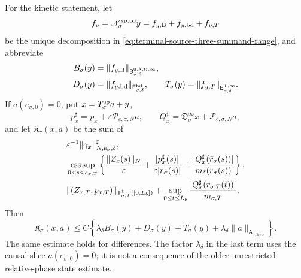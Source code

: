 \begin{lemma}
For the kinetic statement, let
\begin{equation}
 f_y=\mathscr N_\sigma^{\rm sp,\infty}y
 =f_{y,\rm B}+f_{y,\rm bd}+f_{y,T}               \label{eq:kinetic-normal-data-split}
\end{equation}
be the unique decomposition in
\cref{eq:terminal-source-three-summand-range}, and abbreviate
\begin{align}
 B_\sigma(y)&=\|f_{y,\rm B}\|_
  {\mathsf B_{\sigma,\delta}^{0,\lambda,
        \mathrm{tf},\infty}},\notag\\
 D_\sigma(y)&=\|f_{y,\rm bd}\|_
       {\mathsf E_{\sigma,\delta}^{\rm bd}},\qquad
 T_\sigma(y)=\|f_{y,T}\|_
       {\mathsf E_{\sigma,\delta}^{T,\infty}}.  \label{eq:kinetic-normal-data-sizes}
\end{align}
If \(a(e_{\sigma,0})=0\), put
\(x=T_\sigma^{\rm sp}a+y\),
\begin{equation}
 p_x^\sharp=p_x+\varepsilon\mathscr P_{c,\sigma,N}a,
 \qquad
 Q_x^\sharp=\mathfrak D_\sigma^\infty x
                  +\mathscr P_{c,\sigma,N}a,     \label{eq:kinetic-shifted-state}
\end{equation}
and let \(\mathfrak K_\sigma(x,a)\) be the sum of
\begin{align}
 &\varepsilon^{-1}\|\gamma_x\|_{N,e_\sigma,\delta}^{\sharp},\notag\\
 &\operatorname*{ess\,sup}_{0<s<s_{\sigma,T}}
 \left\{\frac{\|Z_x(s)\|_N}{\varepsilon}
 +\frac{|p_x^\sharp(s)|}{\varepsilon|\bar r_\sigma(s)|}
 +\frac{|Q_x^\sharp(\bar r_\sigma(s))|}
             {m_\delta(\bar r_\sigma(s))}\right\},\notag\\
 &\|(Z_{x,T},p_{x,T})\|_
          {\mathsf T_{\sigma,T}^1([0,L_b])}
 +\sup_{0\le t\le L_b}
      \frac{|Q_x^\sharp(\bar r_{\sigma,T}(t))|}{m_{\sigma,T}}.
                                                        \label{eq:piecewise-kinetic-observable}
\end{align}
Then
\begin{equation}
 \mathfrak K_\sigma(x,a)
 \le C\left\{
   \lambda_\delta B_\sigma(y)+D_\sigma(y)+T_\sigma(y)
       +\lambda_\delta
          \|a\|_{\mathsf A_{\sigma,\mathrm{hyb}}}\right\}. \label{eq:piecewise-kinetic-bound}
\end{equation}
The same estimate holds for differences.  The factor
\(\lambda_\delta\) in the last term uses the causal slice
\(a(e_{\sigma,0})=0\); it is not a consequence of the older unrestricted
relative-phase state estimate.
\end{lemma}

